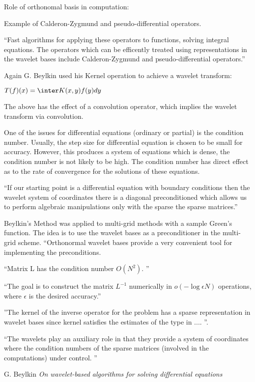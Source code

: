 \documentclass{article}
\begin{document}
Role of orthonomal basis in computation:

Example of Calderon-Zygmund and pseudo-differential operators.

``Fast algorithms for applying these operators to functions, solving integral equations.  The operators which can be efficently treated using representations in the wavelet bases include Calderon-Zygmund and pseudo-differential operators.''

Again G. Beylkin used his Kernel operation to achieve a wavelet transform:

$T(f)(x) = \inter K(x,y) f(y)dy $

The above has the effect of a convolution operator, which implies the wavelet transform via convolution.  

One of the issues for differential equations (ordinary or partial) is the condition number.  Usually, the step size for differential equation is chosen to be small for accuracy.  However, this produces a system of equations which is dense, the condition number is not likely to be high.  The condition number has direct effect as to the rate of convergence for the solutions of these equations.  

``If our starting point is a differential equation with boundary conditions then the wavelet system of coordinates there is a diagonal preconditioned which allows us to perform algebraic manipulations only with the sparse the sparse matrices.''   

Beylkin's Method was applied to multi-grid methods with a sample Green's function.   The idea is to use the wavelet bases as a preconditioner in the multi-grid scheme.  ``Orthonormal wavelet bases provide a very convenient tool for implementing the preconditions.  

``Matrix L has the condition number $O(N^2)$.  ''  

``The goal is to construct the matrix $L^{-1}$ numerically in $o(-\log \epsilon N)$ operations, where $\epsilon$ is the desired accuracy.''

''The kernel of the inverse operator for the problem has a sparse representation in wavelet bases since kernel satisfies the estimates of the type in .... ''.   

``The wavelets play an auxiliary role in that they provide a system of coordinates where the condition numbers of the sparse matrices (involved in the computations) under control.  ''


\bibitem G. Beylkin \textsl{On wavelet-based algorithms for solving differential equations}
\end{document}
